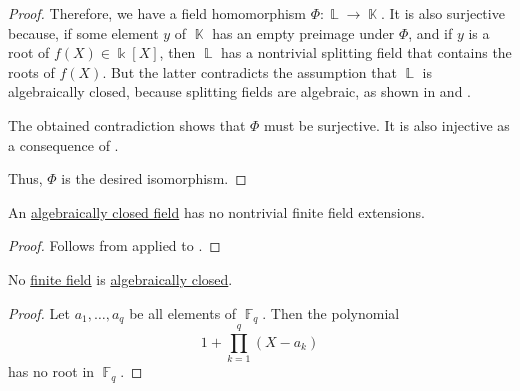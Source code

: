 \begin{proof}
  Therefore, we have a field homomorphism \( \Phi: \BbbL \to \BbbK \). It is also surjective because, if some element \( y \) of \( \BbbK \) has an empty preimage under \( \Phi \), and if \( y \) is a root of \( f(X) \in \Bbbk[X] \), then \( \BbbL \) has a nontrivial splitting field that contains the roots of \( f(X) \). But the latter contradicts the assumption that \( \BbbL \) is algebraically closed, because splitting fields are algebraic, as shown in  and .

  The obtained contradiction shows that \( \Phi \) must be surjective. It is also injective as a consequence of .

  Thus, \( \Phi \) is the desired isomorphism.
\end{proof}

\begin{proposition}\label{thm:no_finite_extensions_of_closed_fields}
  An \hyperref[def:algebraically_closed_field]{algebraically closed field} has no nontrivial finite field extensions.
\end{proposition}
\begin{proof}
  Follows from  applied to .
\end{proof}

\begin{proposition}\label{thm:no_finite_field_is_algebraically_closed}
  No \hyperref[def:finite_field]{finite field} is \hyperref[def:algebraically_closed_field]{algebraically closed}.
\end{proposition}
\begin{proof}
  Let \( a_1, \ldots, a_q \) be all elements of \( \BbbF_q \). Then the polynomial
  \begin{equation*}
    1 + \prod_{k=1}^q (X - a_k)
  \end{equation*}
  has no root in \( \BbbF_q \).
\end{proof}
